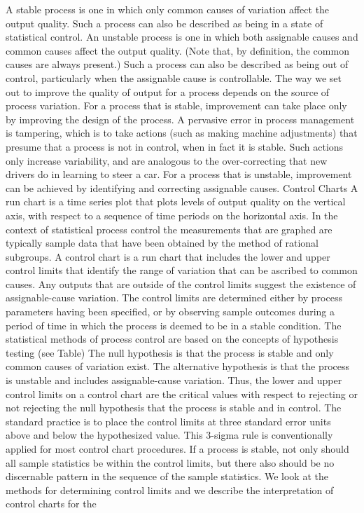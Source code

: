 A stable process is one in which only common causes of variation affect the output quality. Such a process can also be described as being in a state of statistical control. An unstable process is one in which both assignable causes and common causes affect the output quality. (Note that, by definition, the common causes are always present.) Such a process can also be described as being out of control, particularly when the assignable cause is controllable. The way we set out to improve the quality of output for a process depends on the source of process variation. For a process that is stable, improvement can take place only by improving the design of the process. A pervasive error in process management is tampering, which is to take actions (such as making machine adjustments) that presume that a process is not in control, when in fact it is stable. Such actions only increase variability, and are analogous to the over-correcting that new drivers do in learning to steer a car. For a process that is unstable, improvement can be achieved by identifying and correcting assignable causes.
Control Charts 
A run chart is a time series plot that plots levels of output quality on the vertical axis, with respect to a sequence of time periods on the horizontal axis. In the context of statistical process control the measurements that are graphed are typically sample data that have been obtained by the method of rational subgroups. A control chart is a run chart that includes the lower and upper control limits that identify the range of variation that can be ascribed to common causes. Any outputs that are outside of the control limits suggest the existence of assignable-cause variation. The control limits are determined either by process parameters having been specified, or by observing sample outcomes during a period of time in which the process is deemed to be in a stable condition. The statistical methods of process control are based on the concepts of hypothesis testing (see Table) The null hypothesis is that the process is stable and only common causes of variation exist. The alternative hypothesis is that the process is unstable and includes assignable-cause variation. Thus, the lower and upper control limits on a control chart are the critical values with respect to rejecting or not rejecting the null hypothesis that the process is stable and in control. The standard practice is to place the control limits at three standard error units above and below the hypothesized value. This 3-sigma rule is conventionally applied for most control chart procedures. If a process is stable, not only should all sample statistics be within the control limits, but there also should be no discernable pattern in the sequence of the sample statistics. We look at the methods for determining control limits and we describe the interpretation of control charts for the

